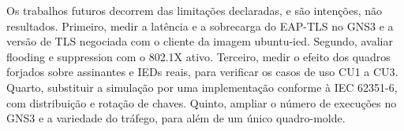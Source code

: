 \documentclass[12pt]{article}
\begin{document}
Os trabalhos futuros decorrem das limitações declaradas, e são intenções, não resultados. Primeiro, medir a latência e a sobrecarga do EAP-TLS no GNS3 e a versão de TLS negociada com o cliente da imagem ubuntu-ied. Segundo, avaliar flooding e suppression com o 802.1X ativo. Terceiro, medir o efeito dos quadros forjados sobre assinantes e IEDs reais, para verificar os casos de uso CU1 a CU3. Quarto, substituir a simulação por uma implementação conforme à IEC 62351-6, com distribuição e rotação de chaves. Quinto, ampliar o número de execuções no GNS3 e a variedade do tráfego, para além de um único quadro-molde.




\end{document}
